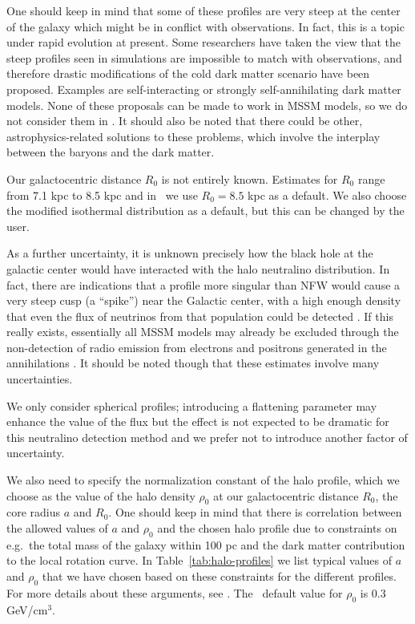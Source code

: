 One should keep in mind that some of these profiles are very steep at
the center of the galaxy which might be in conflict with observations.
In fact, this is a topic under rapid evolution at present.  Some
researchers have taken the view that the steep profiles seen in
simulations are impossible to match with observations, and therefore
drastic modifications of the cold dark matter scenario have been
proposed.  Examples are self-interacting \cite{self} or strongly
self-annihilating \cite{annihil} dark matter models.  None of these
proposals can be made to work in MSSM models, so we do not consider
them in \ds.  It should also be noted that there could be other,
astrophysics-related solutions to these problems, which involve the
interplay between the baryons and the dark matter.

Our galactocentric distance $R_{0}$ is not entirely known. Estimates
for $R_{0}$ range from 7.1 kpc to 8.5 kpc \cite{oll,reid,???} and in
\ds\ we use $R_{0}=8.5$ kpc as a default. 
We also choose the modified isothermal distribution as
a default, but this can be changed by the user.

As a further uncertainty, it is unknown precisely how the black hole
at the galactic center would have interacted with the halo neutralino
distribution. In fact, there are indications that a profile more
singular than NFW would cause a very steep cusp (a ``spike'')
near the Galactic center, with a high enough density that even
the flux of neutrinos from that population could be detected \cite{gs}.
If this really exists, essentially all MSSM models may already be excluded
through the non-detection of radio emission from electrons and
positrons generated in the annihilations \cite{spike}. It should be
noted though that these estimates involve many uncertainties.

We only consider spherical profiles; introducing a flattening
parameter may enhance the value of the flux but the effect is not
expected to be dramatic for this neutralino detection method and we
prefer not to introduce another factor of uncertainty.

We also need to specify the normalization constant of the halo
profile, which we choose as the value of the halo density $\rho_0$ at
our galactocentric distance $R_0$, the core radius $a$ and $R_0$.  One
should keep in mind that there is correlation between the allowed
values of $a$ and $\rho_{0}$ and the chosen halo profile
\cite{bub,pierothesis} due to constraints on e.g.\ the total mass of
the galaxy within 100 pc and the dark matter contribution to the local
rotation curve.  In Table~\ref{tab:halo-profiles} we list typical
values of $a$ and $\rho_{0}$ that we have chosen  based on
these constraints for the different profiles. For more details about these
arguments, see \cite{bub,pierothesis}. The \ds\ default value for
$\rho_{0}$ is 0.3 GeV/cm$^3$.

